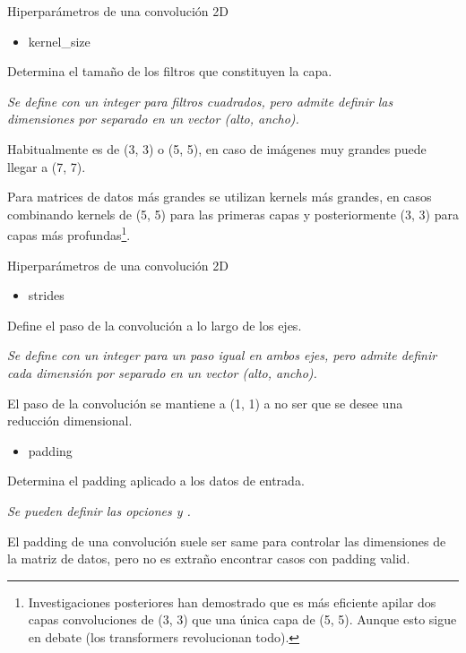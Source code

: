 \begin{frame}{Hiperparámetros de una convolución 2D}
\begin{itemize}
    \item \alert{\Large kernel\_size}
\end{itemize}

Determina el \alert{tamaño de los filtros} que constituyen la capa.

\textit{Se define con un \alert{integer} para filtros \alert{cuadrados}, pero admite definir las dimensiones por separado en un vector \alert{(alto, ancho)}.}

\alert{Habitualmente} es de \alert{(3, 3)} o \alert{(5, 5)}, en caso de imágenes muy grandes puede llegar a \alert{(7, 7)}.

Para matrices de datos \alert{más grandes} se utilizan \alert{kernels más grandes}, en casos combinando kernels de \alert{(5, 5)} para las \alert{primeras capas} y posteriormente \alert{(3, 3)} para capas más \alert{profundas}\footnote{Investigaciones posteriores \cite{simonyan2014very} han demostrado que es más eficiente apilar dos capas convoluciones de (3, 3) que una única capa de (5, 5). Aunque esto sigue en debate \cite{liu2022convnet, ding2022scaling, liu2022more} (los transformers revolucionan todo).}.
\end{frame}

\begin{frame}{Hiperparámetros de una convolución 2D}
\begin{itemize}
    \item \alert{\Large strides}
\end{itemize}

Define el \alert{paso} de la convolución a lo largo de los ejes.

\textit{Se define con un \alert{integer} para un paso igual en \alert{ambos ejes}, pero admite definir cada dimensión por separado en un vector \alert{(alto, ancho)}.}

El paso de la convolución se mantiene a \alert{(1, 1)} a no ser que se desee una \alert{reducción dimensional}.

\begin{itemize}
    \item \alert{\Large padding}
\end{itemize}

Determina el \alert{padding} aplicado a los datos de entrada.

\textit{Se pueden definir las opciones  y .}

El padding de una convolución suele ser \alert{same} para controlar las dimensiones de la matriz de datos, pero no es extraño encontrar casos con padding \alert{valid}.
\end{frame}

